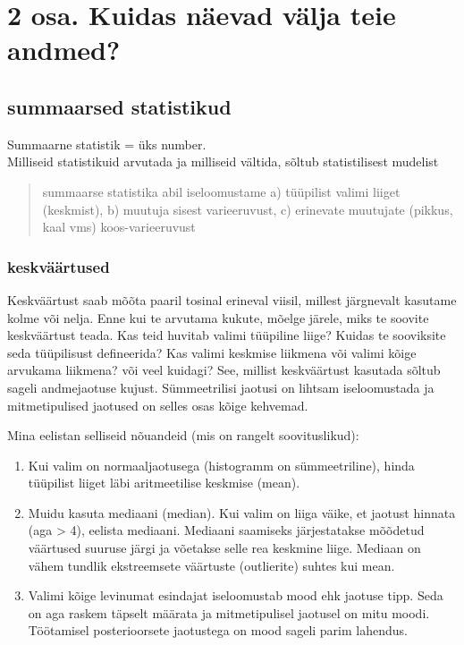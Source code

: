 \documentclass[]{book}
\begin{document}
\chapter{2 osa. Kuidas näevad välja teie
andmed?}\label{osa.-kuidas-naevad-valja-teie-andmed}

\section{summaarsed statistikud}\label{summaarsed-statistikud}

Summaarne statistik = üks number.\\
Milliseid statistikuid arvutada ja milliseid vältida, sõltub
statistilisest mudelist

\begin{quote}
summaarse statistika abil iseloomustame a) tüüpilist valimi liiget
(keskmist), b) muutuja sisest varieeruvust, c) erinevate muutujate
(pikkus, kaal vms) koos-varieeruvust
\end{quote}

\subsection{keskväärtused}\label{keskvaartused}

Keskväärtust saab mõõta paaril tosinal erineval viisil, millest
järgnevalt kasutame kolme või nelja. Enne kui te arvutama kukute, mõelge
järele, miks te soovite keskväärtust teada. Kas teid huvitab valimi
tüüpiline liige? Kuidas te sooviksite seda tüüpilisust defineerida? Kas
valimi keskmise liikmena või valimi kõige arvukama liikmena? või veel
kuidagi? See, millist keskväärtust kasutada sõltub sageli andmejaotuse
kujust. Sümmeetrilisi jaotusi on lihtsam iseloomustada ja mitmetipulised
jaotused on selles osas kõige kehvemad.

Mina eelistan selliseid nõuandeid (mis on rangelt soovituslikud):

\begin{enumerate}
\def\labelenumi{(\arabic{enumi})}
\item
  Kui valim on normaaljaotusega (histogramm on sümmeetriline), hinda
  tüüpilist liiget läbi aritmeetilise keskmise (mean).
\item
  Muidu kasuta mediaani (median). Kui valim on liiga väike, et jaotust
  hinnata (aga \textgreater{} 4), eelista mediaani. Mediaani saamiseks
  järjestatakse mõõdetud väärtused suuruse järgi ja võetakse selle rea
  keskmine liige. Mediaan on vähem tundlik ekstreemsete väärtuste
  (outlierite) suhtes kui mean.
\item
  Valimi kõige levinumat esindajat iseloomustab mood ehk jaotuse tipp.
  Seda on aga raskem täpselt määrata ja mitmetipulisel jaotusel on mitu
  moodi. Töötamisel posterioorsete jaotustega on mood sageli parim
  lahendus.
\end{enumerate}
\end{document}
